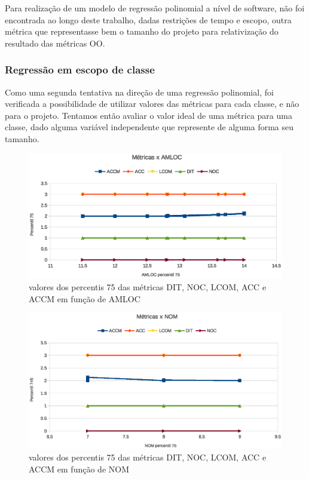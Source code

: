 Para realização de um modelo de regressão polinomial a nível de software, não foi encontrada ao longo deste trabalho, dadas restrições de tempo e escopo, outra métrica que representasse bem o tamanho do projeto para relativização do resultado das métricas OO. 

\subsubsection{Regressão em escopo de classe}

Como uma segunda tentativa na direção de uma regressão polinomial, foi verificada a possibilidade de utilizar valores das métricas para cada classe, e não para o projeto. Tentamos então avaliar o valor ideal de uma métrica para uma classe, dado alguma variável independente que represente de alguma forma seu tamanho.

\begin{figure}[!htb]
\centering
\includegraphics [keepaspectratio=true,scale=0.7]{figuras/metricasxamloc.eps}
\caption{valores dos percentis 75 das métricas DIT, NOC, LCOM, ACC e ACCM em função de AMLOC}
\label{fig:metricasxamloc}
\end{figure}

\begin{figure}[!htb]
\centering
\includegraphics [keepaspectratio=true,scale=0.7]{figuras/metricasxnom.eps}
\caption{valores dos percentis 75 das métricas DIT, NOC, LCOM, ACC e ACCM em função de NOM}
\label{fig:metricasxnom}
\end{figure}

